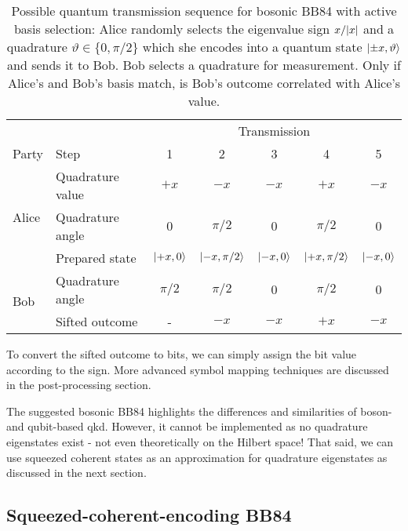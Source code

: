 \begin{table}[htb]
	\centering
	\begin{tabular}{llccccc}
		\toprule
		& & \multicolumn{5}{c}{Transmission} \\
		\cmidrule{3-7}
		Party & Step & 1 & 2 & 3 & 4 & 5 \\ 
		\midrule
		\multirow{3}{*}{Alice} & Quadrature value & $+x$ & $-x$ & $-x$ & $+x$ & $-x$ \\
		& Quadrature angle & $0$ & $\pi/2$ & $0$ & $\pi/2$ & $0$ \\
		& Prepared state & $\ket{+x,0}$ & $\ket{-x,\pi/2}$ & $\ket{-x,0}$ & $\ket{+x,\pi/2}$ & $\ket{-x,0}$ \\
		\cmidrule{1-2}
		\multirow{2}{*}{Bob} & Quadrature angle & $\pi/2$ & $\pi/2$ & $0$ & $\pi/2$ & $0$ \\
		& Sifted outcome & - & $-x$ & $-x$ & $+x$ & $-x$ \\
		\bottomrule
	\end{tabular}
	\caption{Possible quantum transmission sequence for bosonic BB84 with active basis selection: Alice randomly selects the eigenvalue sign $x/\abs{x}$ and a quadrature $\vartheta\in\{0,\pi/2\}$ which she encodes into a quantum state $\ket{\pm x,\vartheta}$ and sends it to Bob. Bob selects a quadrature for measurement. Only if Alice's and Bob's basis match, is Bob's outcome correlated with Alice's value.}\label{tab:boson_transmission_sequence}
\end{table}
To convert the sifted outcome to bits, we can simply assign the bit value according to the sign.
More advanced symbol mapping techniques are discussed in the post-processing section.

The suggested bosonic BB84 highlights the differences and similarities of boson- and qubit-based \gls{qkd}.
However, it cannot be implemented as no quadrature eigenstates exist - not even theoretically on the Hilbert space!
That said, we can use squeezed coherent states as an approximation for quadrature eigenstates as discussed in the next section.

\FloatBarrier
\subsection{Squeezed-coherent-encoding BB84}

